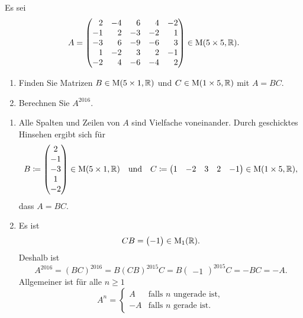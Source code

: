 \begin{question}
 Es sei
 \[
  A =
  \begin{pmatrix*}[r]
    2 & -4 &  6 &  4 & -2 \\
   -1 &  2 & -3 & -2 &  1 \\
   -3 &  6 & -9 & -6 &  3 \\
    1 & -2 &  3 &  2 & -1 \\
   -2 &  4 & -6 & -4 &  2
  \end{pmatrix*}
  \in \Mat(5 \times 5, \R).
 \]
 \begin{enumerate}
  \item
   Finden Sie Matrizen $B \in \operatorname{M}(5 \times 1, \mathbb{R})$ und $C \in \operatorname{M}(1 \times 5, \mathbb{R})$ mit $A = BC$.
  \item
   Berechnen Sie $A^{2016}$.
 \end{enumerate}
\end{question}
\begin{solution}
 \begin{enumerate}
  \item
   Alle Spalten und Zeilen von $A$ sind Vielfache voneinander. Durch geschicktes Hinsehen ergibt sich für
   \[
    B \coloneqq
   \begin{pmatrix}
      2 \\
     -1 \\
     -3 \\
      1 \\
     -2
    \end{pmatrix} \in \operatorname{M}(5 \times 1, \mathbb{R})
    \quad \text{und} \quad
    C \coloneqq
    \begin{pmatrix}
     1 & -2 & 3 & 2 & -1
    \end{pmatrix} \in \operatorname{M}(1 \times 5, \mathbb{R}),
   \]
   dass $A = BC$.
  \item
   Es ist
   \[
    CB = \begin{pmatrix}-1\end{pmatrix} \in \operatorname{M}_1(\mathbb{R}).
   \]
   Deshalb ist
   \[
    A^{2016} = (BC)^{2016} = B (CB)^{2015} C = B \begin{pmatrix}-1\end{pmatrix}^{2015} C = -BC = -A.
   \]
   Allgemeiner ist für alle $n \geq 1$
   \[
    A^n =
    \begin{cases}
      A & \text{falls $n$ ungerade ist}, \\
     -A & \text{falls $n$ gerade ist}.
    \end{cases}
   \]
 \end{enumerate}
\end{solution}


